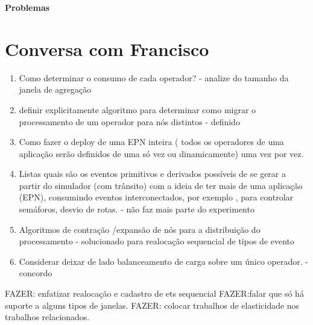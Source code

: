%
%
%
%
\newpage
\textbf{\Huge{Problemas}}

\section{Conversa com Francisco}
\begin{enumerate}
\item Como determinar o consumo de cada operador? - 
analize do tamanho da janela de agregação


\item definir explicitamente algoritmo para determinar como migrar o processamento de um operador para nós distintos
 - definido
 
 
\item Como fazer o deploy de uma EPN inteira ( todos os operadores de uma aplicação serão definidos de uma só vez ou dinamicamente)
uma vez por vez. 
\item Listas quais são os eventos primitivos e derivados possíveis de se gerar a partir do simulador (com trânsito) com a ideia de ter mais de uma aplicação (EPN), consumindo eventos interconectados, por exemplo , para controlar semáforos, desvio de rotas.
 - não faz mais parte do experimento
\item Algoritmos de contração /expansão de nós para a distribuição do processamento - solucionado para realocação sequencial de tipos de evento
\item Considerar deixar de lado balanceamento de carga sobre um único operador. - concordo
\end{enumerate}
FAZER: enfatizar realocação e cadastro de ets sequencial 
FAZER:falar que só há suporte a alguns tipos de janelas.
FAZER: colocar trabalhos de elasticidade nos trabalhos relacionados.

